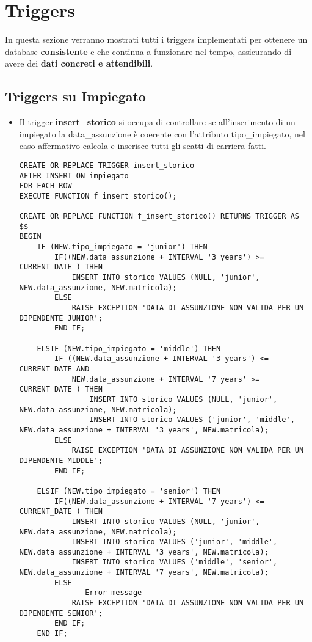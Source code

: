 \section{Triggers}


In questa sezione verranno mostrati tutti i triggers implementati per ottenere un database \textbf{consistente} e che continua a funzionare nel tempo, assicurando di avere dei \textbf{dati concreti e attendibili}. \\

\subsection{Triggers su Impiegato}
    \begin{itemize}
    
\item Il trigger \textbf{insert\_storico} si occupa di controllare se all'inserimento di un impiegato la data\_assunzione è coerente con l'attributo tipo\_impiegato, nel caso affermativo calcola e inserisce tutti gli scatti di carriera fatti.
\scriptsize %
\begin{lstlisting}
CREATE OR REPLACE TRIGGER insert_storico
AFTER INSERT ON impiegato
FOR EACH ROW
EXECUTE FUNCTION f_insert_storico();

CREATE OR REPLACE FUNCTION f_insert_storico() RETURNS TRIGGER AS
$$
BEGIN
    IF (NEW.tipo_impiegato = 'junior') THEN
        IF((NEW.data_assunzione + INTERVAL '3 years') >= CURRENT_DATE ) THEN
            INSERT INTO storico VALUES (NULL, 'junior', NEW.data_assunzione, NEW.matricola);
        ELSE
            RAISE EXCEPTION 'DATA DI ASSUNZIONE NON VALIDA PER UN DIPENDENTE JUNIOR';
        END IF;
    
    ELSIF (NEW.tipo_impiegato = 'middle') THEN
        IF ((NEW.data_assunzione + INTERVAL '3 years') <= CURRENT_DATE AND
            NEW.data_assunzione + INTERVAL '7 years' >= CURRENT_DATE ) THEN
                INSERT INTO storico VALUES (NULL, 'junior', NEW.data_assunzione, NEW.matricola);
                INSERT INTO storico VALUES ('junior', 'middle', NEW.data_assunzione + INTERVAL '3 years', NEW.matricola);
        ELSE
            RAISE EXCEPTION 'DATA DI ASSUNZIONE NON VALIDA PER UN DIPENDENTE MIDDLE';
        END IF;
    
    ELSIF (NEW.tipo_impiegato = 'senior') THEN
        IF((NEW.data_assunzione + INTERVAL '7 years') <= CURRENT_DATE ) THEN
            INSERT INTO storico VALUES (NULL, 'junior', NEW.data_assunzione, NEW.matricola);
            INSERT INTO storico VALUES ('junior', 'middle', NEW.data_assunzione + INTERVAL '3 years', NEW.matricola);
            INSERT INTO storico VALUES ('middle', 'senior', NEW.data_assunzione + INTERVAL '7 years', NEW.matricola);
        ELSE
            -- Error message
            RAISE EXCEPTION 'DATA DI ASSUNZIONE NON VALIDA PER UN DIPENDENTE SENIOR';
        END IF;	
    END IF;
    

\end{lstlisting}
\end{itemize}
